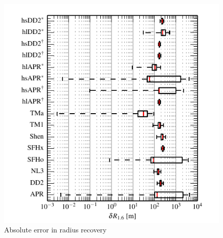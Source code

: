 \documentclass[serif,mathserif,10pt]{beamer}
\let\oldframetitle\frametitle%
\renewcommand{\frametitle}[1]{%
      \oldframetitle{#1}\setstretch{1.2}}
\begin{document}
\begin{frame}
\begin{columns}[]
        \begin{center}
            \vspace{-0.5cm}
            \begin{figure}
                \includegraphics[width=1\columnwidth]{figures/deltaRadii.pdf}
                \caption{Absolute error in radius recovery}
            \end{figure}
        \end{center}

    \end{columns}

\end{frame}


%
%
%
%
%
%
\end{document}
